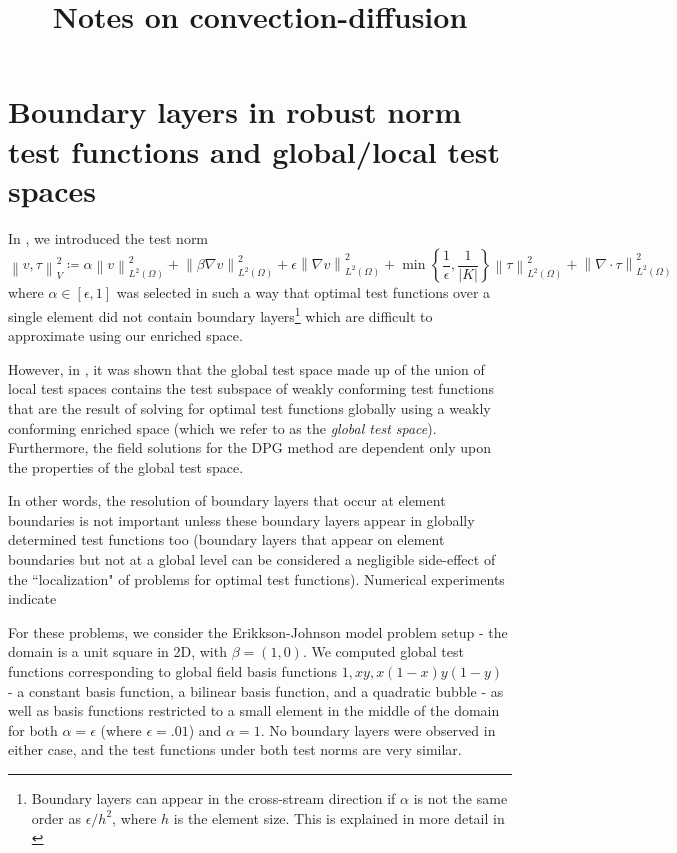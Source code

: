 \documentclass[11pt,onecolumn]{scrartcl}
\title{Notes on convection-diffusion}
\date{}
\newcommand{\nor}[1]{\left\| #1 \right\|}
\newcommand{\LRp}[1]{\left( #1 \right)}
\newcommand{\LRc}[1]{\left\{ #1 \right\}}
\newcommand{\LRb}[1]{\left| #1 \right|}
\renewcommand{\L}{L^2\LRp{\Omega}}
\newcommand{\grad}{\nabla}
\renewcommand{\div}{\grad \cdot}
\begin{document}
\maketitle

\section{Boundary layers in robust norm test functions and global/local test spaces}

In \cite{DPGrobustness, ChanHeuerBui-ThanhDemkowicz12}, we introduced the test norm
\[
\nor{v,\tau}_V^2 \coloneqq \alpha\nor{v}_{\L}^2 + \nor{\beta\grad v}_{\L}^2 + \epsilon \nor{\grad v}_{\L}^2 + {\min}\LRc{\frac{1}{\epsilon},\frac{1}{\LRb{K}}}\nor{\tau}_{\L}^2 + \nor{\div \tau}_{\L}^2
\]
where $\alpha \in [\epsilon,1]$ was selected in such a way that optimal test functions over a single element did not contain boundary layers\footnote{Boundary layers can appear in the cross-stream direction if $\alpha$ is not the same order as $\epsilon/h^2$, where $h$ is the element size.  This is explained in more detail in \cite{ChanHeuerBui-ThanhDemkowicz12}} which are difficult to approximate using our enriched space.  

However, in \cite{globalLocalDPG}, it was shown that the global test space made up of the union of local test spaces contains the test subspace of weakly conforming test functions that are the result of solving for optimal test functions globally using a weakly conforming enriched space (which we refer to as the \textit{global test space}).  Furthermore, the field solutions for the DPG method are dependent only upon the properties of the global test space.  

In other words, the resolution of boundary layers that occur at element boundaries is not important unless these boundary layers appear in globally determined test functions too (boundary layers that appear on element boundaries but not at a global level can be considered a negligible side-effect of the ``localization" of problems for optimal test functions).  Numerical experiments indicate

For these problems, we consider the Erikkson-Johnson model problem setup - the domain is a unit square in 2D, with $\beta = \LRp{1,0}$.  We computed global test functions corresponding to global field basis functions $1, xy, x(1-x)y(1-y)$ - a constant basis function, a bilinear basis function, and a quadratic bubble - as well as basis functions restricted to a small element in the middle of the domain for both $\alpha = \epsilon$ (where $\epsilon = .01$) and $\alpha = 1$.  No boundary layers were observed in either case, and the test functions under both test norms are very similar. 
\end{document}

